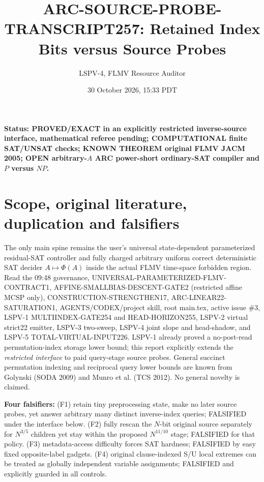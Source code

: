 \documentclass[10pt]{article}
\title{ARC-SOURCE-PROBE-TRANSCRIPT257: Retained Index Bits versus Source Probes}
\author{LSPV-4, FLMV Resource Auditor}
\date{30 October 2026, 15:33 PDT}
\begin{document}
\maketitle
\noindent\textbf{Status: PROVED/EXACT in an explicitly restricted inverse-source interface, mathematical referee pending; COMPUTATIONAL finite SAT/UNSAT checks; KNOWN THEOREM original FLMV JACM 2005; OPEN arbitrary-$A$ ARC power-short ordinary-SAT compiler and $P$ versus $NP$.}
\section{Scope, original literature, duplication and falsifiers}
The only main spine remains the user's universal state-dependent parameterized residual-SAT controller and fully charged arbitrary uniform correct deterministic SAT decider $A\mapsto\Phi(A)$ inside the actual FLMV time-space forbidden region. Read the 09:48 governance, UNIVERSAL-PARAMETERIZED-FLMV-CONTRACT1, AFFINE-SMALLBIAS-DESCENT-GATE2 (restricted affine MCSP only), CONSTRUCTION-STRENGTHEN17, ARC-LINEAR22-SATURATION1, AGENTS/CODEX/project skill, root main.tex, active issue \#3, LSPV-1 MULTIINDEX-GATE254 and HEAD-HORIZON255, LSPV-2 virtual strict22 emitter, LSPV-3 two-sweep, LSPV-4 joint slope and head-shadow, and LSPV-5 TOTAL-VIRTUAL-INPUT226. LSPV-1 already proved a no-post-read permutation-index storage lower bound; this report explicitly extends the \emph{restricted interface} to paid query-stage source probes. General succinct permutation indexing and reciprocal query lower bounds are known from Golynski (SODA 2009) and Munro et al. (TCS 2012). No general novelty is claimed.
\par\noindent\textbf{Four falsifiers:} (F1) retain tiny preprocessing state, make no later source probes, yet answer arbitrary many distinct inverse-index queries; FALSIFIED under the interface below. (F2) fully rescan the $N$-bit original source separately for $N^{3/5}$ children yet stay within the proposed $N^{11/10}$ stage; FALSIFIED for that policy. (F3) metadata-access difficulty forces SAT hardness; FALSIFIED by easy fixed opposite-label gadgets. (F4) original clause-indexed S/U local extremes can be treated as globally independent variable assignments; FALSIFIED and explicitly guarded in all controls.
\end{document}

